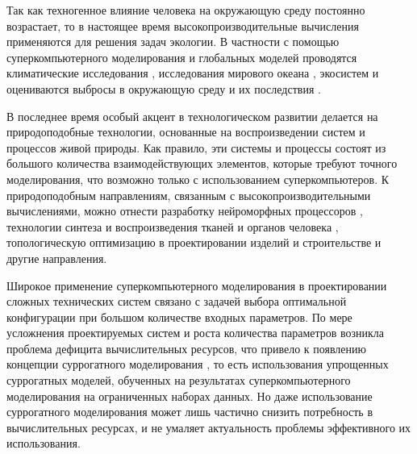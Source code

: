 \documentclass[a4paper,14pt]{extarticle}                     %
\numberwithin{equation}{section}                             %
\numberwithin{figure}{section}                               %
\numberwithin{table}{section}                                %
\theoremstyle{plain}                                         %
\numberwithin{theorem}{section}                              %
\numberwithin{lemma}{section}                                %
\numberwithin{definition}{section}                           %
\begin{document}
Так как техногенное влияние человека на окружающую среду постоянно возрастает, то в настоящее время высокопроизводительные вычисления применяются для решения задач экологии.
В частности с помощью суперкомпьютерного моделирования и глобальных моделей проводятся климатические исследования \cite{Kulkarni2024SuperClimate}, исследования мирового океана \cite{Wei2024SuperOcean}, экосистем \cite{Rahman2024SuperSpecies} и оцениваются выбросы в окружающую среду и их последствия \cite{Ostromsky2024SuperAir}.

В последнее время особый акцент в технологическом развитии делается на природоподобные технологии, основанные на воспроизведении систем и процессов живой природы.
Как правило, эти системы и процессы состоят из большого количества взаимодействующих элементов, которые требуют точного моделирования, что возможно только с использованием суперкомпьютеров.
К природоподобным направлениям, связанным с высокопроизводительными вычислениями, можно отнести разработку нейроморфных процессоров \cite{Rhodes2019SuperNuero}, технологии синтеза и воспроизведения тканей и органов человека \cite{Wang2012SuperTissues}, топологическую оптимизацию в проектировании изделий и строительстве \cite{Fedchikov2024SuperBim} и другие направления.

Широкое применение суперкомпьютерного моделирования в проектировании сложных технических систем связано с задачей выбора оптимальной конфигурации при большом количестве входных параметров.
По мере усложнения проектируемых систем и роста количества параметров возникла проблема дефицита вычислительных ресурсов, что привело к появлению концепции суррогатного моделирования \cite{Jiang2020Surrogate,Barcenas2023Surrogate,Catalani2024Surrogate}, то есть использования упрощенных суррогатных моделей, обученных на результатах суперкомпьютерного моделирования на ограниченных наборах данных.
Но даже использование суррогатного моделирования может лишь частично снизить потребность в вычислительных ресурсах, и не умаляет актуальность проблемы эффективного их использования.
\end{document}
